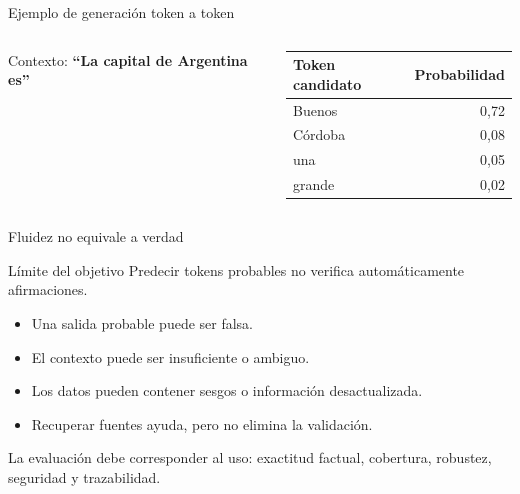 \documentclass[aspectratio=169,10pt]{beamer}
\newcommand{\concepto}[1]{\textcolor{UAPTeal}{\textbf{#1}}}
\begin{document}
\begin{frame}{Ejemplo de generación token a token}
  \begin{columns}[T]
    Contexto: \concepto{“La capital de Argentina es”}
    \begin{center}
      \begin{tabular}{lr}\toprule
      Token candidato & Probabilidad\\\midrule
      Buenos & 0,72\\
      Córdoba & 0,08\\
      una & 0,05\\
      grande & 0,02\\\bottomrule
      \end{tabular}
    \end{center}
  \end{columns}
\end{frame}

\begin{frame}{Fluidez no equivale a verdad}
  \begin{alertblock}{Límite del objetivo}
    Predecir tokens probables no verifica automáticamente afirmaciones.
  \end{alertblock}
  \begin{itemize}
    \item Una salida probable puede ser falsa.
    \item El contexto puede ser insuficiente o ambiguo.
    \item Los datos pueden contener sesgos o información desactualizada.
    \item Recuperar fuentes ayuda, pero no elimina la validación.
  \end{itemize}
  La evaluación debe corresponder al uso: exactitud factual, cobertura, robustez, seguridad y trazabilidad.
\end{frame}
\end{document}
